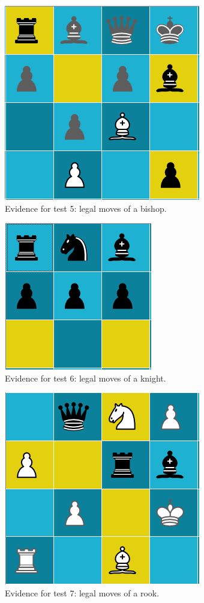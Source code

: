 \documentclass[twoside, 12pt]{report}
\begin{document}
\begin{figure}[H]
	\centering
	\includegraphics{images/screenshots/test-5}
	\caption{Evidence for test 5: legal moves of a bishop.}
	\label{test-5}
\end{figure}
\begin{figure}[H]
	\centering
	\includegraphics{images/screenshots/test-6}
	\caption{Evidence for test 6: legal moves of a knight.}
	\label{test-6}
\end{figure}
\begin{figure}[H]
	\centering
	\includegraphics{images/screenshots/test-7}
	\caption{Evidence for test 7: legal moves of a rook.}
	\label{test-7}
\end{figure}
\end{document}
